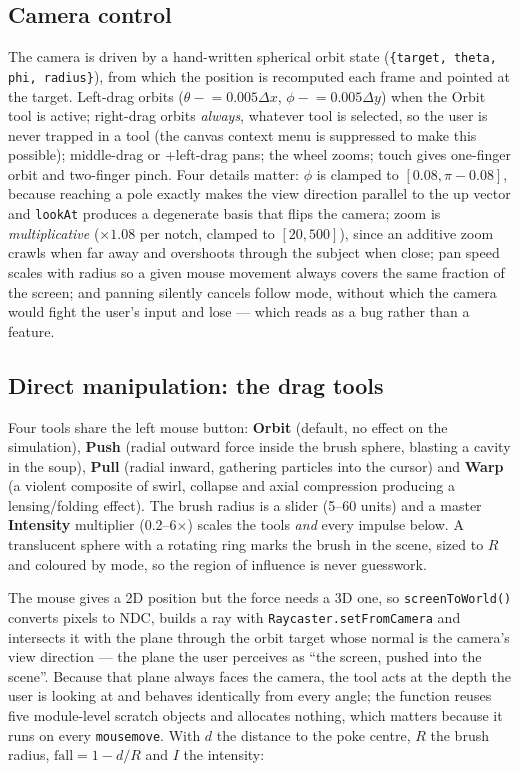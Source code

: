 \documentclass[10pt,a4paper]{article}
\newcommand{\code}[1]{\texttt{\small #1}}
\newcommand{\keys}[1]{\textsf{\small\fbox{#1}}}
\begin{document}
\subsection{Camera control}
\label{sec:orbit}

The camera is driven by a hand-written spherical orbit state
(\code{\{target, theta, phi, radius\}}), from which the position is recomputed each frame and pointed at
the target. Left-drag orbits ($\theta \mathrel{-}= 0.005\Delta x$, $\phi \mathrel{-}= 0.005\Delta y$) when
the Orbit tool is active; right-drag orbits \emph{always}, whatever tool is selected, so the user is never
trapped in a tool (the canvas context menu is suppressed to make this possible); middle-drag or
\keys{Shift}+left-drag pans; the wheel zooms; touch gives one-finger orbit and two-finger pinch. Four
details matter: $\phi$ is clamped to $[0.08,\pi-0.08]$, because reaching a pole exactly makes the view
direction parallel to the up vector and \code{lookAt} produces a degenerate basis that flips the camera;
zoom is \emph{multiplicative} ($\times1.08$ per notch, clamped to $[20,500]$), since an additive zoom crawls
when far away and overshoots through the subject when close; pan speed scales with radius so a given mouse
movement always covers the same fraction of the screen; and panning silently cancels follow mode, without
which the camera would fight the user's input and lose --- which reads as a bug rather than a feature.

\subsection{Direct manipulation: the drag tools}

Four tools share the left mouse button: \textbf{Orbit} (default, no effect on the simulation),
\textbf{Push} (radial outward force inside the brush sphere, blasting a cavity in the soup), \textbf{Pull}
(radial inward, gathering particles into the cursor) and \textbf{Warp} (a violent composite of swirl,
collapse and axial compression producing a lensing/folding effect). The brush radius is a slider (5--60
units) and a master \textbf{Intensity} multiplier (0.2--6$\times$) scales the tools \emph{and} every impulse
below. A translucent sphere with a rotating ring marks the brush in the scene, sized to $R$ and coloured by
mode, so the region of influence is never guesswork.

The mouse gives a 2D position but the force needs a 3D one, so \code{screenToWorld()} converts pixels to
NDC, builds a ray with \code{Raycaster.setFromCamera} and intersects it with the plane through the orbit
target whose normal is the camera's view direction --- the plane the user perceives as ``the screen, pushed
into the scene''. Because that plane always faces the camera, the tool acts at the depth the user is
looking at and behaves identically from every angle; the function reuses five module-level scratch objects
and allocates nothing, which matters because it runs on every \code{mousemove}. With $d$ the distance to the poke centre, $R$ the brush radius,
$\text{fall}=1-d/R$ and $I$ the intensity:
\end{document}
